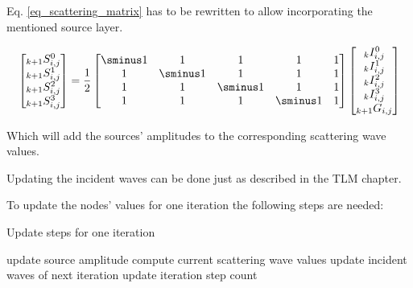 \documentclass[twocolumn]{article}
\begin{document}
Eq. \ref{eq_scattering_matrix} has to be rewritten to allow incorporating the
mentioned source layer.

\begin{equation}
\begin{bmatrix}
    _{k+1}S_{i,j}^{0} \\
    _{k+1}S_{i,j}^{1} \\
    _{k+1}S_{i,j}^{2} \\
    _{k+1}S_{i,j}^{3} \\
\end{bmatrix}
=
\frac{1}{2}
\begin{bmatrix}
    \sminus1 & 1 & 1 & 1 & 1\\
    1 & \sminus1 & 1 & 1 & 1\\
    1 & 1 & \sminus1 & 1 & 1\\
    1 & 1 & 1 & \sminus1 & 1\\
\end{bmatrix}
\begin{bmatrix}
    _kI_{i,j}^{0} \\
    _kI_{i,j}^{1} \\
    _kI_{i,j}^{2} \\
    _kI_{i,j}^{3} \\
    _{k+1}G_{i,j} \\
\end{bmatrix}
\label{eq_source_scattering_matrix}
\end{equation}

Which will add the sources' amplitudes to the corresponding scattering wave values.

Updating the incident waves can be done just as described in the TLM chapter.

To update the nodes' values for one iteration the following steps are needed:
\begin{algorithm}[H]
\caption{Update steps for one iteration}
\begin{algorithmic}[1]
        \State update source amplitude
    \EndFor
            \State compute current scattering wave values
        \EndFor
    \EndFor
            \State update incident waves of next iteration
        \EndFor
    \EndFor
    \State update iteration step count
    \EndProcedure
\end{algorithmic}
\end{algorithm}
\end{document}
